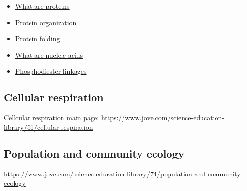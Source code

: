 \documentclass[
]{book}
\providecommand{\tightlist}{%
  \setlength{\itemsep}{0pt}\setlength{\parskip}{0pt}}
\begin{document}
\begin{itemize}
\tightlist
\item
  \href{https://www.jove.com/science-education/10677/what-are-proteins}{What are proteins}
\item
  \href{https://www.jove.com/science-education/10678/protein-organization}{Protein organization}
\item
  \href{https://www.jove.com/science-education/10679/protein-folding}{Protein folding}
\item
  \href{https://www.jove.com/science-education/10684/what-are-nucleic-acids}{What are nucleic acids}
\item
  \href{https://www.jove.com/science-education/10685/phosphodiester-linkages}{Phosphodiester linkages}
\end{itemize}

\hypertarget{cellular-respiration}{%
\subsection{Cellular respiration}\label{cellular-respiration}}

Cellcular respiration main page: \url{https://www.jove.com/science-education-library/51/cellular-respiration}

\hypertarget{population-and-community-ecology}{%
\subsection{Population and community ecology}\label{population-and-community-ecology}}

\url{https://www.jove.com/science-education-library/74/population-and-community-ecology}
\end{document}

